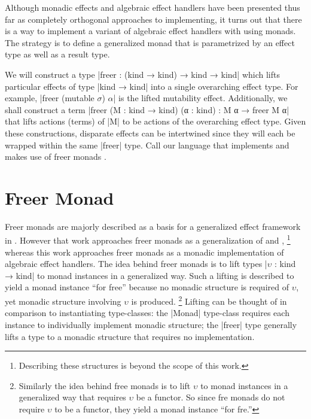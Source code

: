Although monadic effects and algebraic effect handlers have been presented thus far as completely orthogonal approaches to implementing, it turns out that there is a way to implement a variant of algebraic effect handlers with \LangA using monads.
The strategy is to define a generalized monad that is parametrized by an effect type as well as a result type.

We will construct a type \code|freer : (kind → kind) → kind → kind| which lifts particular effects of type \code|kind → kind| into a single overarching effect type.
For example, \code|freer (mutable $σ$) $α$| is the lifted mutability effect.
Additionally, we shall construct a term \code|freer (M : kind → kind) (α : kind) : M α → freer M α| that lifts actions (terms) of \code|M| to be actions of the overarching effect type.
Given these constructions, disparate effects can be intertwined since they will each be wrapped within the same \code|freer| type.
Call our language that implements and makes use of freer monads \LangE.

\section{Freer Monad}


Freer monads are majorly described as a basis for a generalized effect framework in \cite{KiselyovIshii2015}.
However that work approaches freer monads as a generalization of  and ,%
\footnote{
  Describing these structures is beyond the scope of this work.
}
whereas this work approaches freer monads as a monadic implementation of algebraic effect handlers.
The idea behind freer monads is to lift types \code|$υ$ : kind → kind| to monad instances in a generalized way.
Such a lifting is described to yield a monad instance ``for free'' because no monadic structure is required of $υ$, yet monadic structure involving $υ$ is produced.%
\footnote{
  Similarly the idea behind free monads is to lift $υ$ to monad instances in a generalized way that requires $υ$ be a functor.
  So since fre monads do not require $υ$ to be a functor, they yield a monad instance ``for fre.''
}
Lifting can be thought of in comparison to instantiating type-classes:
the \code|Monad| type-class requires each instance to individually implement monadic structure;
the \code|freer| type generally lifts a type to a monadic structure that requires no implementation.

